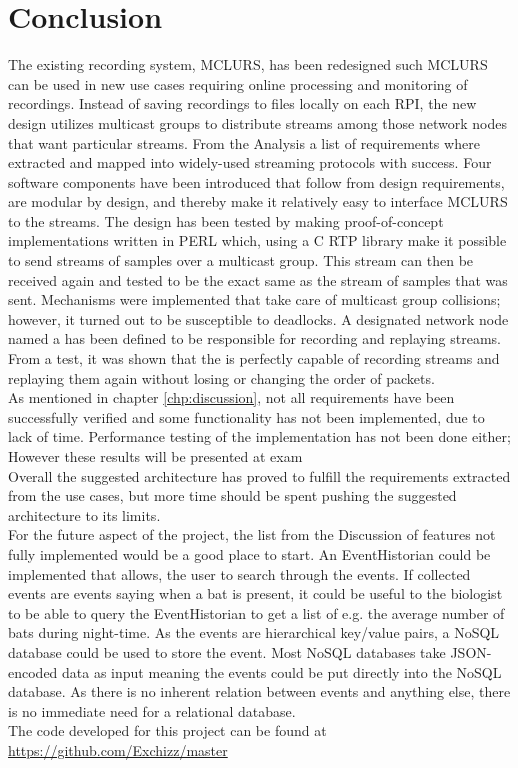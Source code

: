 \chapter{Conclusion}
The existing recording system, MCLURS, has been redesigned such MCLURS can be used in new use cases requiring online processing and monitoring of recordings. Instead of saving recordings to files locally on each RPI, the new design utilizes multicast groups to distribute streams among those network nodes that want particular streams. From the Analysis a list of requirements where extracted and mapped into widely-used streaming protocols with success. Four software components have been introduced that follow from design requirements, are modular by design, and thereby make it relatively easy to interface MCLURS to the streams. The design has been tested by making proof-of-concept implementations written in PERL which, using a C RTP library make it possible to send streams of samples over a multicast group. This stream can then be received again and tested to be the exact same as the stream of samples that was sent. Mechanisms were implemented that take care of multicast group collisions; however, it turned out to be susceptible to deadlocks. A designated network node named a \hist{} has been defined to be responsible for recording and replaying streams. From a test, it was shown that the \hist{} is perfectly capable of recording streams and replaying them again without losing or changing the order of packets. \\

\noindent{}As mentioned in chapter \ref{chp:discussion}, not all requirements have been successfully verified and some functionality has not been implemented, due to lack of time. Performance testing of the implementation has not been done either; However these results will be presented at exam\\

\noindent{} Overall the suggested architecture has proved to fulfill the requirements extracted from the use cases, but more time should be spent pushing the suggested architecture to its limits.\\

\noindent{}For the future aspect of the project, the list from the Discussion of features not fully implemented would be a good place to start. An EventHistorian could be implemented that allows, the user to search through the events. If collected events are events saying when a bat is present, it could be useful to the biologist to be able to query the EventHistorian to get a list of e.g. the average number of bats during night-time. As the events are hierarchical key/value pairs, a NoSQL database could be used to store the event. Most NoSQL databases take JSON-encoded data as input meaning the events could be put directly into the NoSQL database. As  there is no inherent relation between events and anything else, there is no immediate need for a relational database.\\

\noindent{}The code developed for this project can be found at \url{https://github.com/Exchizz/master}
